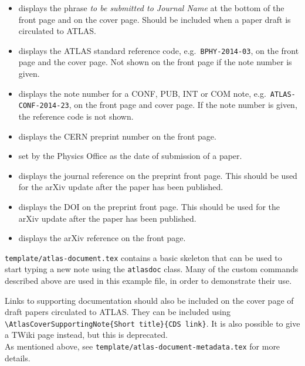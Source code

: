 \begin{itemize}
  \item {} displays the phrase \emph{to
    be submitted to Journal Name} at the bottom of the front page and
    on the cover page.
    Should be included when a paper draft is circulated to ATLAS.

  \item {} displays the ATLAS
    standard reference code, e.g.\ \texttt{BPHY-2014-03}, on the front page and
    the cover page. Not shown on the front page if the note number is given.

  \item {} displays the note number
    for a CONF, PUB, INT or COM note, e.g.\ \texttt{ATLAS-CONF-2014-23},
    on the front page and cover page.
    If the note number is given, the reference code is not shown.

  \item {} displays the CERN
    preprint number on the front page.
    
  \item {} set by the Physics Office as the date of submission of a paper.

  \item {} displays the journal reference
    on the preprint front page.
    This should be used for the arXiv update after the paper has been published.

  \item {} displays the DOI
    on the preprint front page.
    This should be used for the arXiv update after the paper has been published.

  \item {} displays the arXiv reference
    on the front page.

\end{itemize}
%
\texttt{template/atlas-document.tex} contains a basic skeleton that can be
used to start typing a new note using the \texttt{atlasdoc} class. Many of
the custom commands described above are used in this example file, in
order to demonstrate their use.

Links to supporting documentation should also be included on the cover page of draft papers circulated to ATLAS.
They can be included using
\verb|\AtlasCoverSupportingNote{Short title}{CDS link}|.
It is also possible to give a TWiki page instead, but this is deprecated.\\
As mentioned above, see \texttt{template/atlas-document-metadata.tex} for more details.



